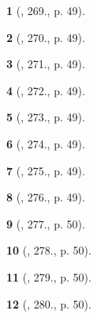 \documentclass{article}
\newtheorem{baitoan}{}
\begin{document}
\begin{baitoan}[\cite{Binh_Toan_8_tap_1}, 269., p. 49]
	
\end{baitoan}

\begin{baitoan}[\cite{Binh_Toan_8_tap_1}, 270., p. 49]
	
\end{baitoan}

\begin{baitoan}[\cite{Binh_Toan_8_tap_1}, 271., p. 49]
	
\end{baitoan}

\begin{baitoan}[\cite{Binh_Toan_8_tap_1}, 272., p. 49]
	
\end{baitoan}

\begin{baitoan}[\cite{Binh_Toan_8_tap_1}, 273., p. 49]
	
\end{baitoan}

\begin{baitoan}[\cite{Binh_Toan_8_tap_1}, 274., p. 49]
	
\end{baitoan}

\begin{baitoan}[\cite{Binh_Toan_8_tap_1}, 275., p. 49]
	
\end{baitoan}

\begin{baitoan}[\cite{Binh_Toan_8_tap_1}, 276., p. 49]
	
\end{baitoan}

\begin{baitoan}[\cite{Binh_Toan_8_tap_1}, 277., p. 50]
	
\end{baitoan}

\begin{baitoan}[\cite{Binh_Toan_8_tap_1}, 278., p. 50]
	
\end{baitoan}

\begin{baitoan}[\cite{Binh_Toan_8_tap_1}, 279., p. 50]
	
\end{baitoan}

\begin{baitoan}[\cite{Binh_Toan_8_tap_1}, 280., p. 50]
	
\end{baitoan}
\end{document}
